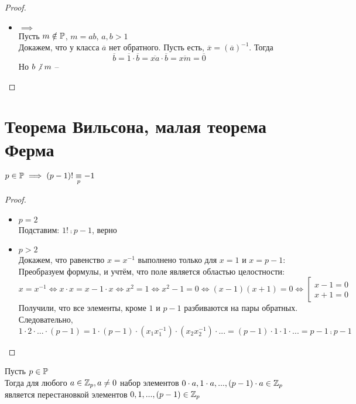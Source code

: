 \begin{theorem}
\begin{itemize}
\begin{proof}
\begin{itemize}
				\item $\implies$ \\
				Пусть $m \notin \mathbb{P}$, $ m = ab$, $a, b > 1 $ \\
				Докажем, что у класса $\overline{a}$ нет обратного. Пусть есть, $\overline{x} = (\overline{a})^{-1} $. Тогда
				$$ \overline{b} = \overline{1} \cdot \overline{b} = \overline{xa} \cdot \overline{b} = \overline{xm} = \overline{0} $$
				Но $b \ndivby m$ -- \contra
			\end{itemize}
		\end{proof}
	\end{itemize}
\end{theorem}

\section{Теорема Вильсона, малая теорема Ферма}

\begin{theorem}[Вильсона]
	$ p \in \mathbb{P} \implies (p - 1)! \underset{p}{\equiv} -1 $
\end{theorem}

\begin{proof}
	\hfill
	\begin{itemize}
		\item $p = 2$ \\
		Подставим: $1! \comp{p} -1$, верно
		\item $p > 2$ \\
		Докажем, что равенство $x = x^{-1}$ выполнено только для $x = 1$ и $x = p - 1$: \\
		Преобразуем формулы, и учтём, что поле является областью целостности:
		$$ x = x^{-1} \iff x \cdot x = x - 1 \cdot x \iff x^2 = 1 \iff x^2 - 1 = 0 \iff (x - 1)(x + 1) = 0 \iff \left[
		\begin{aligned}
			x - 1 = 0 \\
			x + 1 = 0
		\end{aligned} \right. $$
		Получили, что все элементы, кроме $1$ и $p - 1$ разбиваются на пары обратных. Следовательно,
		$$ 1 \cdot 2 \cdot ... \cdot (p - 1) = 1 \cdot (p - 1) \cdot (x_1x_1^{-1}) \cdot (x_2x_2^{-1}) \cdot ... = (p - 1) \cdot 1 \cdot 1 \cdot ... = p - 1 \comp{p} - 1 $$
	\end{itemize}
\end{proof}

\begin{lemma}
	Пусть $p \in \mathbb{P}$ \\
	Тогда для любого $a \in \mathbb{Z}_p, a \ne 0$ набор элементов $0 \cdot a, 1 \cdot a, ..., (p - 1) \cdot a \in \mathbb{Z}_p$ является перестановкой элементов $0, 1, ..., (p - 1) \in \mathbb{Z}_p$
\end{lemma}

